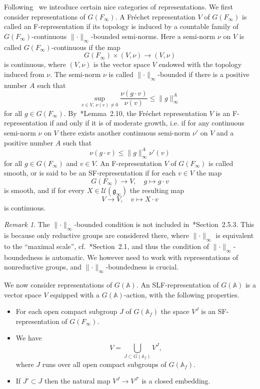 \documentclass[letterpaper,11pt]{amsart}
\newcommand{\fg}{\mathfrak{g}}
\newcommand{\bA}{\mathbb{A}}
\newcommand{\cU}{\mathcal{U}}
\newcommand{\<}{\negthickspace}
\providecommand{\aabs}[1]{\lVert#1\rVert}
\theoremstyle{definition}
\theoremstyle{plain}
\theoremstyle{remark}
\newtheorem{remark}[definition]{Remark}
\numberwithin{equation}{section}
\begin{document}
Following~\cites{BK,BPCZ}
we introduce certain nice categories of representations. We first consider
representations of $G(F_\infty)$. A Fr\'{e}chet representation $V$ of
$G(F_\infty)$ is called an F-representation if its topology is induced by a
countable family of $G(F_\infty)$-continuous $\aabs{\cdot}_{\infty}$-bounded
semi-norms. Here a semi-norm $\nu$ on $V$ is called
$G(F_\infty)$-continuous if the map
    \[
    G(F_\infty) \times (V, \nu) \to (V, \nu)
    \]
is continuous, where $(V, \nu)$ is the vector space $V$ endowed with the
topology induced from $\nu$. The semi-norm $\nu$ is called
$\aabs{\cdot}_\infty$-bounded if there is a positive number $A$ such that
    \[
    \sup_{v \in V,\, \nu(v) \not=0} \frac{\nu(g\cdot v)}{\nu(v)}
    \leq \aabs{g}_\infty^A
    \]
for all $g \in G(F_\infty)$. By~\cite{BK}*{Lemma~2.10}, the Fr\'{e}chet
representation $V$ is an F-representation if and only if it is of
moderate growth, i.e.
if for any continuous semi-norm $\nu$ on $V$ there exists another continuous
semi-norm $\nu'$ on $V$ and a positive number $A$ such that
    \[
    \nu(g \cdot v) \leq \aabs{g}_\infty^A \nu'(v)
    \]
for all $g \in G(F_\infty)$ and $v \in V$. An F-representation $V$
of $G(F_\infty)$ is called smooth, or is said to be an SF-representation if
for each $v \in V$ the map
    \[
    G(F_\infty) \to V, \quad g \mapsto g \cdot v
    \]
is smooth, and if for every $X \in \cU(\fg_{\infty})$ the resulting map
    \[
    V \to V, \quad v \mapsto X \cdot v
    \]
is continuous.

\begin{remark}
The $\aabs{\cdot}_\infty$-bounded condition is not included
in~\cite{BPCZ}*{Section~2.5.3}. This is because only reductive groups are
considered there, where $\aabs{\cdot}_{\infty}$ is equivalent to the
``maximal scale'', cf.~\cite{BK}*{Section~2.1}, and thus the condition of
$\aabs{\cdot}_\infty$-boundedness is automatic. We however need to work with
representations
of nonreductive groups, and $\aabs{\cdot}_\infty$-boundedness is crucial.
\end{remark}

We now consider representations of $G(\bA)$. An SLF-representation of $G(\bA)$
is a vector space $V$ equipped with a $G(\bA)$-action, with the following
properties.
\begin{itemize}
\item For each open compact subgroup $J$ of $G(\bA_f)$ the space $V^J$ is an
    SF-representation of $G(F_\infty)$.

\item We have
    \[
    V = \bigcup_{J \subset G(\bA_f)} V^J,
    \]
    where $J$ runs over all open compact subgroups of $G(\bA_f)$.

\item If $J' \subset J$ then the natural map $V^J \to V^{J'}$ is a closed embedding.
\end{itemize}
\end{document}
